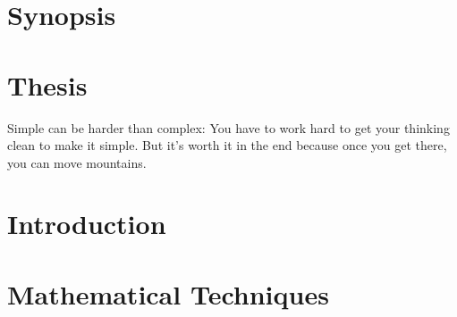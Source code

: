 \documentclass[School=TIFR,twoside]{Dissertate}
\begin{document}



\maketitle

\onehalfspacing
\ifnodeclaration
\else
\ifscanneddeclaration

\else
\declarationpage
\fi
\fi

\cleardoublepage

\abstractpage

\cleardoublepage
\singlespacing
\tableofcontents
\dedicationpage
\doublespacing

\acknowledgments
\ifnosynopsis
\else
{}
\part*{\sc Synopsis}



\part*{\sc Thesis}
\cleardoublepage
{}
\fi
\begin{savequote}[75mm] 
Simple can be harder than complex: You have to work hard to get your thinking clean to make it simple. But it’s worth it in the end because once you get there, you can move mountains. 
\end{savequote}
\chapter*{}

\part{Introduction}\label{part:one}

\setcounter{chapter}{0}  


\part{Mathematical Techniques}\label{part:two}





\end{document}
